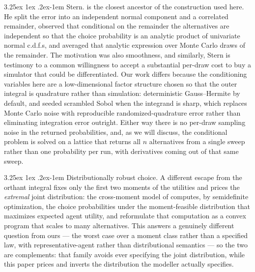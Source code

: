 \documentclass[11pt]{article}
\makeatletter
\renewcommand\paragraph{\@startsection{paragraph}{4}{\z@}%
  {3.25ex \@plus1ex \@minus.2ex}{-1em}%
  {\normalfont\normalsize\itshape}}
\makeatother
\begin{document}
\paragraph{Stern.}
\citet{stern1992} is the closest ancestor of the construction used here.
He split the error into an independent normal component and a correlated
remainder, observed that conditional on the remainder the alternatives
are independent so that the choice probability is an analytic product of
univariate normal c.d.f.s, and averaged that analytic expression over
Monte Carlo draws of the remainder. The motivation was also smoothness, and
similarly, Stern is testimony to a common willingness to accept a substantial per-draw cost to buy a simulator that could be differentiated. Our work differs because the conditioning variables here are a
low-dimensional factor structure chosen so that the outer integral is
quadrature rather than simulation: deterministic Gauss--Hermite by
default, and seeded scrambled Sobol when the integrand is sharp, which
replaces Monte Carlo noise with reproducible randomized-quadrature error
rather than eliminating integration error outright. Either way there is
no per-draw sampling noise in the returned probabilities, and, as we will discuss, the conditional problem is solved on a lattice that returns all $n$ alternatives from a single sweep rather than one probability per run, with derivatives coming out of that same
sweep.

\paragraph{Distributionally robust choice.} A different escape from the
orthant integral fixes only the first two moments of the utilities and
prices the \emph{extremal} joint distribution: the cross-moment model of
\citet{mishra2012} computes, by semidefinite optimization, the choice
probabilities under the moment-feasible distribution that maximizes
expected agent utility, and \citet{ahipasaoglu2019} reformulate that
computation as a convex program that scales to many alternatives. This
answers a genuinely different question from ours --- the worst case over
a moment class rather than a specified law, with representative-agent
rather than distributional semantics --- so the two are complements: that
family avoids ever specifying the joint distribution, while this paper
prices and inverts the distribution the modeller actually specifies.
\end{document}
